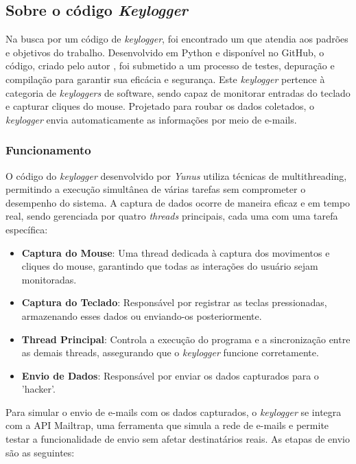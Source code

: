 \documentclass[12pt]{article}
\begin{document}
\subsection{Sobre o código \textit{Keylogger}}

Na busca por um código de \textit{keylogger}, foi encontrado um que atendia aos padrões e objetivos do trabalho. Desenvolvido em Python e disponível no GitHub, o código, criado pelo autor \citep{Aydinnyunus}, foi submetido a um processo de testes, depuração e compilação para garantir sua eficácia e segurança. Este \textit{keylogger} pertence à categoria de \textit{keyloggers} de software, sendo capaz de monitorar entradas do teclado e capturar cliques do mouse. Projetado para roubar os dados coletados, o \textit{keylogger} envia automaticamente as informações por meio de e-mails.

\subsubsection{Funcionamento}

O código do \textit{keylogger} desenvolvido por \textit{Yunus} utiliza técnicas de multithreading, permitindo a execução simultânea de várias tarefas sem comprometer o desempenho do sistema. A captura de dados ocorre de maneira eficaz e em tempo real, sendo gerenciada por quatro \textit{threads} principais, cada uma com uma tarefa específica:

\begin{itemize}
    \item \textbf{Captura do Mouse}: Uma thread dedicada à captura dos movimentos e cliques do mouse, garantindo que todas as interações do usuário sejam monitoradas.
    \item \textbf{Captura do Teclado}: Responsável por registrar as teclas pressionadas, armazenando esses dados ou enviando-os posteriormente.
    \item \textbf{Thread Principal}: Controla a execução do programa e a sincronização entre as demais threads, assegurando que o \textit{keylogger} funcione corretamente.
    \item \textbf{Envio de Dados}: Responsável por enviar os dados capturados para o 'hacker'.
\end{itemize}

Para simular o envio de e-mails com os dados capturados, o \textit{keylogger} se integra com a API Mailtrap, uma ferramenta que simula a rede de e-mails e permite testar a funcionalidade de envio sem afetar destinatários reais. As etapas de envio são as seguintes:
\end{document}
